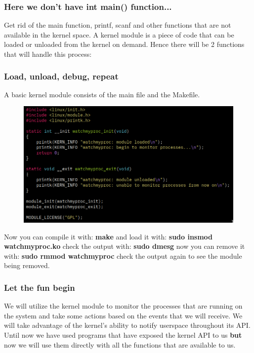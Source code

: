 \documentclass{beamer}
\begin{document}
\begin{frame}
    \frametitle{Here we don't have int main() function...}
    \small
    Get rid of the main function, printf, scanf and other functions that are
    not available in the kernel space. \newline \newline
    A kernel module is a piece of code that can be loaded or unloaded
    from the kernel on demand. Hence there will be 2 functions that will
    handle this process: \newline
\end{frame}

\begin{frame}
    \frametitle{Load, unload, debug, repeat}
    \footnotesize
    A basic kernel module consists of the main file and the Makefile.
    \begin{figure}
        \includegraphics[width=0.7\linewidth] {simplekernel}
        \label{fig:simplekernel}
    \end{figure}
    Now you can compile it with:
    \textbf{make}
    \newline
    and load it with:
    \textbf{sudo insmod watchmyproc.ko}
    \newline
    check the output with:
    \textbf{sudo dmesg}
    \newline
    now you can remove it with:
    \textbf{sudo rmmod watchmyproc}
    \newline
    check the output again to see the module being removed.

\end{frame}

\begin{frame}
    \frametitle{Let the fun begin}
    \small
    We will utilize the kernel module to monitor the processes that are
    running on the system and take some actions based on the events that
    we will receive.
    \newline
    \newline
    We will take advantage of the kernel's ability to notify userspace
    throughout its API.
    \newline
    \newline
    Until now we have used programs that have exposed the kernel API to us
    \textbf{but} now we will use them directly with all the functions
    that are available to us.
\end{frame}
\end{document}
